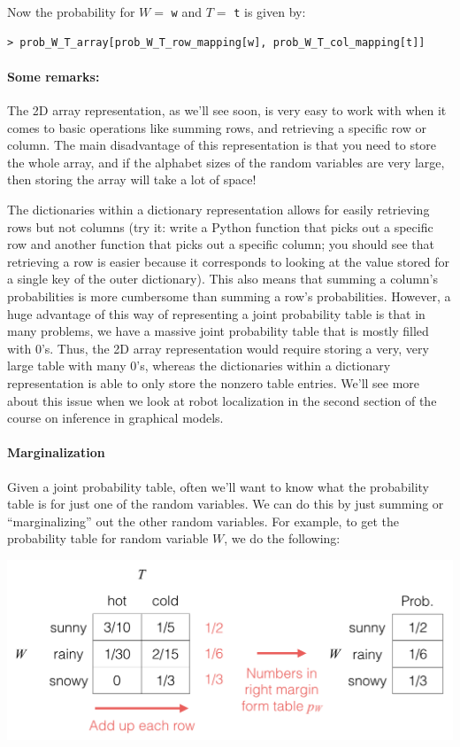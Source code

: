 \documentclass[6008notes.tex]{subfiles}
\begin{document}
Now the probability for $W =$ \texttt{w} and $T =$ \texttt{t} is given by:

\begin{lstlisting}
> prob_W_T_array[prob_W_T_row_mapping[w], prob_W_T_col_mapping[t]]
\end{lstlisting}

\paragraph{Some remarks:} The 2D array representation, as we'll see soon, is very easy to work with when it comes to basic operations like summing rows, and retrieving a specific row or column. The main disadvantage of this representation is that you need to store the whole array, and if the alphabet sizes of the random variables are very large, then storing the array will take a lot of space!

The dictionaries within a dictionary representation allows for easily retrieving rows but not columns (try it: write a Python function that picks out a specific row and another function that picks out a specific column; you should see that retrieving a row is easier because it corresponds to looking at the value stored for a single key of the outer dictionary). This also means that summing a column's probabilities is more cumbersome than summing a row's probabilities. However, a huge advantage of this way of representing a joint probability table is that in many problems, we have a massive joint probability table that is mostly filled with 0's. Thus, the 2D array representation would require storing a very, very large table with many 0's, whereas the dictionaries within a dictionary representation is able to only store the nonzero table entries. We'll see more about this issue when we look at robot localization in the second section of the course on inference in graphical models.

\paragraph{Marginalization}

Given a joint probability table, often we'll want to know what the probability table is for just one of the random variables. We can do this by just summing or ``marginalizing'' out the other random variables. For example, to get the probability table for random variable $W$, we do the following:

{\centering\includegraphics[scale=0.4]{images_sec-joint-rv-marg-rows}}
\end{document}
